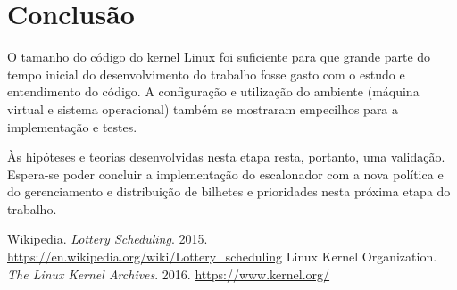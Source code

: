 \documentclass[a4paper,12pt]{article}
\begin{document}
\section{Conclusão}
O tamanho do código do kernel Linux foi suficiente para que grande parte do tempo inicial do desenvolvimento do trabalho fosse gasto com o estudo e entendimento do código. A configuração e utilização do ambiente (máquina virtual e sistema operacional) também se mostraram empecilhos para a implementação e testes.

Às hipóteses e teorias desenvolvidas nesta etapa resta, portanto, uma validação. Espera-se poder concluir a implementação do escalonador com a nova política e do gerenciamento e distribuição de bilhetes e prioridades nesta próxima etapa do trabalho.


\begin{thebibliography}{9}
 Wikipedia. \emph{Lottery Scheduling}. 2015. \url{https://en.wikipedia.org/wiki/Lottery_scheduling}
 Linux Kernel Organization. \emph{The Linux Kernel Archives}. 2016. \url{https://www.kernel.org/}
\end{thebibliography}
\end{document}
